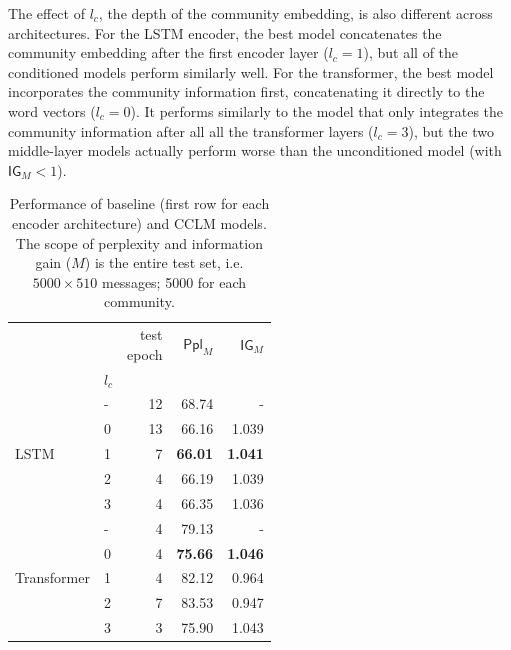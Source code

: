 \documentclass[11pt]{article}
\newcommand\Ppl{\mathsf{Ppl}}
\newcommand\IG{\mathsf{IG}}
\begin{document}
The effect of $l_c$, the depth of the community embedding,
is also different across architectures.
For the LSTM encoder, 
the best model concatenates the community embedding after the first encoder layer ($l_c=1$),
but all of the conditioned models perform similarly well.
For the transformer, the best model incorporates the community information
first, concatenating it directly to the word vectors ($l_c=0$).
It performs similarly to the model that only integrates the community information
after all all the transformer layers ($l_c=3$),
but the two middle-layer models actually perform worse than the unconditioned model
(with $\IG_M < 1$).

\begin{table}
  \small
  \centering
  \begin{tabular}{llrrr}
  \toprule
                                 &       & \makecell{test \\ epoch} & $\Ppl_M$ & $\IG_M$     \\
                                 & $l_c$ &         &                 &                   \\
  \midrule
  \multirow{5}{*}{LSTM}         & - &          12 &  68.74          &       -           \\
                                & 0 &          13 &  66.16          &    1.039          \\
                                & 1 &           7 &  \textbf{66.01} &    \textbf{1.041} \\
                                & 2 &           4 &  66.19          &    1.039          \\
                                & 3 &           4 &  66.35          &    1.036          \\
  \midrule
  \multirow{5}{*}{Transformer}  & - &           4 &  79.13          &        -          \\
                                & 0 &           4 &  \textbf{75.66} &    \textbf{1.046} \\
                                & 1 &           4 &  82.12          &    0.964          \\
                                & 2 &           7 &  83.53          &    0.947          \\
                                & 3 &           3 &  75.90          &    1.043          \\
  \bottomrule
  \end{tabular}
  \caption{
    Performance of baseline (first row for each encoder architecture)
    and CCLM models.  The scope of perplexity and information gain
    ($M$) is the entire test set, i.e. $5000×510$ messages; \num{5000}
    for each community.}
  \label{tab:model-results}
\end{table}
\end{document}
